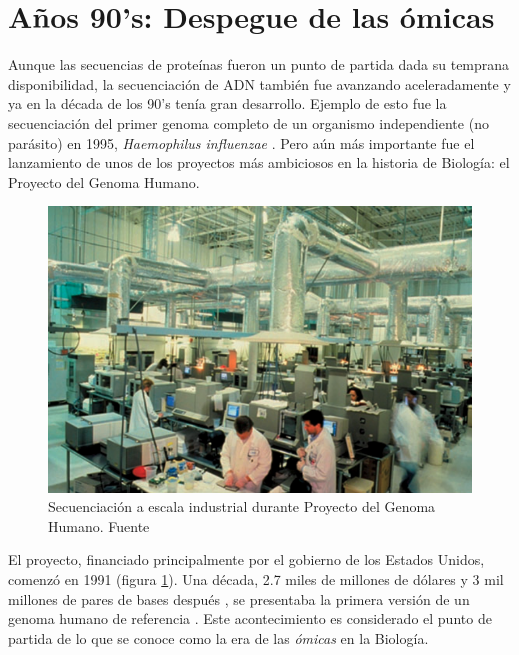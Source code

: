 \section{Años 90's: Despegue de las ómicas}

Aunque las secuencias de proteínas fueron un punto de partida dada su temprana disponibilidad, la secuenciación de ADN también fue avanzando aceleradamente y ya en la década de los 90's tenía gran desarrollo.
Ejemplo de esto fue la secuenciación del primer genoma completo de un organismo independiente (no parásito) en 1995, \textit{Haemophilus influenzae} \cite{fleischmannWholegenomeRandomSequencing1995}.
Pero aún más importante fue el lanzamiento de unos de los proyectos más ambiciosos en la historia de Biología: el Proyecto del Genoma Humano.

\begin{figure}[tb]
  \centering
  \includegraphics[width=0.7\columnwidth]{images/human_genome_project.png}
  \caption{Secuenciación a escala industrial durante Proyecto del Genoma Humano. Fuente \cite{gauthierBriefHistoryBioinformatics2019}}
  \label{fig:human_genome_project}
\end{figure}

El proyecto, financiado principalmente por el gobierno de los Estados Unidos, comenzó en 1991 (figura \ref{fig:human_genome_project}).
Una década, 2.7 miles de millones de dólares y 3 mil millones de pares de bases después \cite{web:HGP_FAQ}, se presentaba la primera versión de un genoma humano de referencia \cite{internationalhumangenomesequencingconsortiumFinishingEuchromaticSequence2004}.
Este acontecimiento es considerado el punto de partida de lo que se conoce como la era de las \textit{ómicas} en la Biología.


